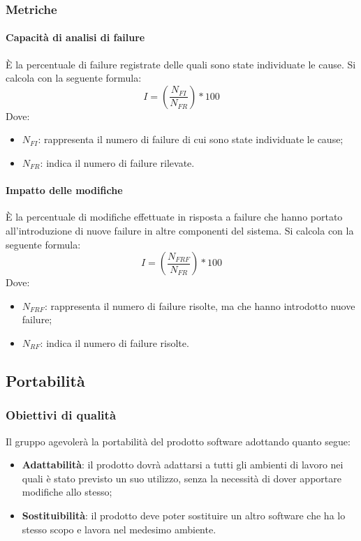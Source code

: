 \documentclass[../PianoDiQualifica.tex]{subfiles}
\begin{document}
				\subsubsection{Metriche}
					\paragraph{Capacità di analisi di failure}
					È la percentuale di failure registrate delle quali sono state individuate le cause. Si calcola con la seguente formula:
					\begin{equation*}
						I = (\frac{N_{FI}}{N_{FR}}) * 100
					\end{equation*}
					Dove:
					\begin{itemize}
						\item \textbf{$	N_{FI}$}: rappresenta il numero di failure di cui sono state individuate le cause;
						\item \textbf{$N_{FR}$}: indica il numero di failure rilevate.
					\end{itemize}

				\paragraph{Impatto delle modifiche}
					È la percentuale di modifiche effettuate in risposta a failure che hanno portato all'introduzione di nuove failure in altre componenti del sistema. Si calcola con la seguente formula:
					\begin{equation*}
						I = (\frac{N_{FRF}}{N_{FR}}) * 100
					\end{equation*}
					Dove:
					\begin{itemize}
						\item \textbf{$	N_{FRF}$}: rappresenta il numero di failure risolte, ma che hanno introdotto nuove failure;
						\item \textbf{$N_{RF}$}: indica il numero di failure risolte.
					\end{itemize}


			\subsection{Portabilità}
				\subsubsection{Obiettivi di qualità}
				Il gruppo agevolerà la portabilità del prodotto software adottando quanto segue:
				\begin{itemize}
					\item \textbf{Adattabilità}: il prodotto dovrà adattarsi a tutti gli ambienti di lavoro nei quali è stato previsto un suo utilizzo, senza la necessità di dover apportare modifiche allo stesso;
					\item \textbf{Sostituibilità}: il prodotto deve poter sostituire un altro software che ha lo stesso scopo e lavora nel medesimo ambiente.
				\end{itemize}
\end{document}
